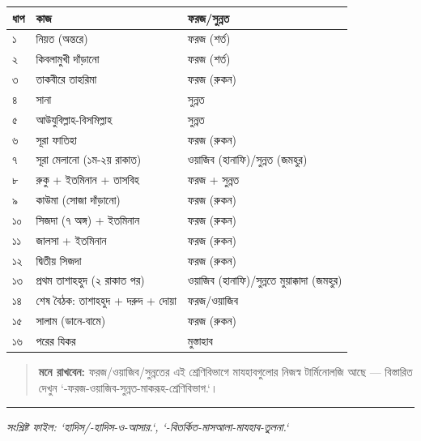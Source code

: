 \begin{table}[h]\centering\small
\begin{tabular}{lll}
ধাপ & কাজ & ফরজ/সুন্নত \\
\hline
১ & নিয়ত (অন্তরে) & ফরজ (শর্ত) \\
২ & কিবলামুখী দাঁড়ানো & ফরজ (শর্ত) \\
৩ & তাকবীরে তাহরিমা & ফরজ (রুকন) \\
৪ & সানা & সুন্নত \\
৫ & আউযুবিল্লাহ-বিসমিল্লাহ & সুন্নত \\
৬ & সূরা ফাতিহা & ফরজ (রুকন) \\
৭ & সূরা মেলানো (১ম-২য় রাকাত) & ওয়াজিব (হানাফি)/সুন্নত (জমহুর) \\
৮ & রুকু + ইতমিনান + তাসবিহ & ফরজ + সুন্নত \\
৯ & কাউমা (সোজা দাঁড়ানো) & ফরজ (রুকন) \\
১০ & সিজদা (৭ অঙ্গ) + ইতমিনান & ফরজ (রুকন) \\
১১ & জালসা + ইতমিনান & ফরজ (রুকন) \\
১২ & দ্বিতীয় সিজদা & ফরজ (রুকন) \\
১৩ & প্রথম তাশাহহুদ (২ রাকাত পর) & ওয়াজিব (হানাফি)/সুন্নতে মুয়াক্কাদা (জমহুর) \\
১৪ & শেষ বৈঠক: তাশাহহুদ + দরুদ + দোয়া & ফরজ/ওয়াজিব \\
১৫ & সালাম (ডানে-বামে) & ফরজ (রুকন) \\
১৬ & পরের যিকর & মুস্তাহাব \\
\hline
\end{tabular}
\end{table}

\begin{quote}
\textbf{মনে রাখবেন:} ফরজ/ওয়াজিব/সুন্নতের এই শ্রেণিবিভাগে মাযহাবগুলোর নিজস্ব টার্মিনোলজি আছে — বিস্তারিত দেখুন `-ফরজ-ওয়াজিব-সুন্নত-মাকরূহ-শ্রেণিবিভাগ.`।
\end{quote}

\medskip\hrule\medskip
\textit{সংশ্লিষ্ট ফাইল: `হাদিস/-হাদিস-ও-আসার.`, `-বিতর্কিত-মাসআলা-মাযহাব-তুলনা.`}



